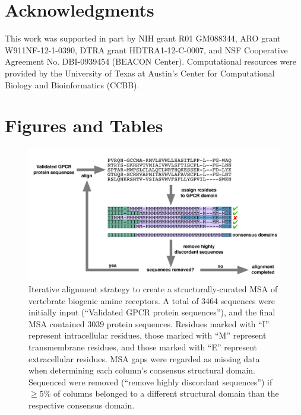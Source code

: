 \documentclass[fleqn,10pt]{wlpeerj}
\begin{document}
\section*{Acknowledgments}
This work was supported in part by NIH grant R01 GM088344, ARO grant W911NF-12-1-0390, DTRA grant HDTRA1-12-C-0007, and NSF Cooperative Agreement No. DBI-0939454 (BEACON Center).  Computational resources were provided by the University of Texas at Austin's Center for Computational Biology and Bioinformatics (CCBB).





\newpage


\section*{Figures and Tables}

\vspace{3cm}

\begin{figure}[htbp]
	\centerline{\includegraphics[width=18cm]{figures/alignment_flowchart.pdf}}
	\caption{\label{flowchart} Iterative alignment strategy to create a structurally-curated MSA of vertebrate biogenic amine receptors. A total of 3464 sequences were initially input (``Validated GPCR protein sequences''), and the final MSA contained 3039 protein sequences. Residues marked with ``I'' represent intracellular residues, those marked with ``M'' represent transmembrane residues, and those marked with ``E'' represent extracellular residues. MSA gaps were regarded as missing data when determining each column's consensus structural domain. Sequenced were removed (``remove highly discordant sequences'') if $\geq 5\%$ of columns belonged to a different structural domain than the respective consensus domain.}
\end{figure}
\end{document}
